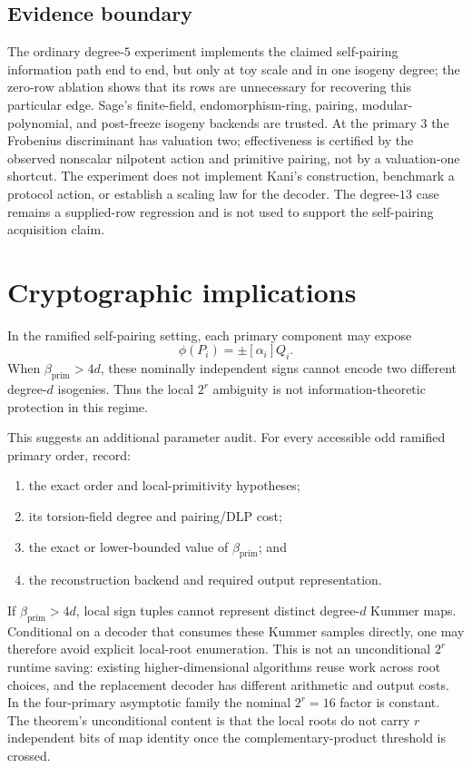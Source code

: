 \documentclass[11pt]{article}
\newcommand{\betaP}{\beta_{\mathrm{prim}}}
\begin{document}
\subsection{Evidence boundary}

The ordinary degree-$5$ experiment implements the claimed self-pairing
information path end to end, but only at toy scale and in one isogeny degree;
the zero-row ablation shows that its rows are unnecessary for recovering this
particular edge.
Sage's finite-field, endomorphism-ring, pairing, modular-polynomial, and
post-freeze isogeny backends are trusted.  At the primary $3$ the Frobenius
discriminant has valuation two; effectiveness is certified by the observed
nonscalar nilpotent action and primitive pairing, not by a valuation-one
shortcut.  The experiment does not implement Kani's construction, benchmark
a protocol action, or establish a scaling law for the decoder.  The
degree-$13$ case remains a supplied-row regression and is not used to support
the self-pairing acquisition claim.

\section{Cryptographic implications}

In the ramified self-pairing setting, each primary component may expose
\[
 \phi(P_i)=\pm[\alpha_i]Q_i.
\]
When $\betaP>4d$, these nominally independent signs cannot encode two
different degree-$d$ isogenies.  Thus the local $2^r$ ambiguity is not
information-theoretic protection in this regime.

This suggests an additional parameter audit.  For every accessible odd
ramified primary order, record:

\begin{enumerate}[leftmargin=*,label=(\arabic*)]
\item the exact order and local-primitivity hypotheses;
\item its torsion-field degree and pairing/DLP cost;
\item the exact or lower-bounded value of $\betaP$; and
\item the reconstruction backend and required output representation.
\end{enumerate}

If $\betaP>4d$, local sign tuples cannot represent distinct degree-$d$ Kummer
maps.  Conditional on a decoder that consumes these Kummer samples directly,
one may therefore avoid explicit local-root enumeration.  This is not an
unconditional $2^r$ runtime saving: existing higher-dimensional algorithms
reuse work across root choices, and the replacement decoder has different
arithmetic and output costs.  In the four-primary asymptotic family the
nominal $2^r=16$ factor is constant.  The theorem's unconditional content is
that the local roots do not carry $r$ independent bits of map identity once
the complementary-product threshold is crossed.
\end{document}

